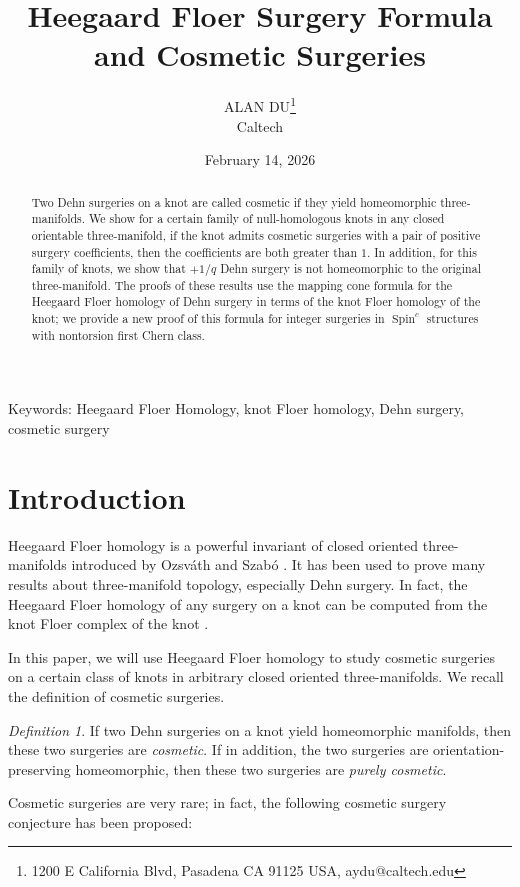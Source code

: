 \documentclass{article}
\title{Heegaard Floer Surgery Formula and Cosmetic Surgeries}
\author{ALAN DU\thanks{1200 E California Blvd, Pasadena CA 91125 USA, aydu@caltech.edu} \\
Caltech}
\date{February 14, 2026}
\theoremstyle{remark}
\newtheorem{definition}[equation]{Definition}
\numberwithin{equation}{section}
\numberwithin{table}{section}
\DeclareMathOperator{\Spin}{Spin}
\renewcommand{\(}{\left(}
\renewcommand{\)}{\right)}
\begin{document}
\maketitle
\begin{abstract}
Two Dehn surgeries on a knot are called cosmetic if they yield homeomorphic three-manifolds. We show for a certain family of null-homologous knots in any closed orientable three-manifold, if the knot admits cosmetic surgeries with a pair of positive surgery coefficients, then the coefficients are both greater than $1$. In addition, for this family of knots, we show that $+1/q$ Dehn surgery is not homeomorphic to the original three-manifold. The proofs of these results use the mapping cone formula for the Heegaard Floer homology of Dehn surgery in terms of the knot Floer homology of the knot; we provide a new proof of this formula for integer surgeries in $\Spin^c$ structures with nontorsion first Chern class.
\end{abstract}


Keywords: Heegaard Floer Homology, knot Floer homology, Dehn surgery, cosmetic surgery

\section{Introduction}

Heegaard Floer homology is a powerful invariant of closed oriented three-manifolds introduced by Ozsv\'ath and Szab\'o \cite{oz-sz-hf}. It has been used to prove many results about three-manifold topology, especially Dehn surgery. In fact, the Heegaard Floer homology of any surgery on a knot can be computed from the knot Floer complex of the knot \cite{oz-sz-integer,oz-sz-rational,zemke-hf-surgery-formula}. 

In this paper, we will use Heegaard Floer homology to study cosmetic surgeries on a certain class of knots in arbitrary closed oriented three-manifolds. We recall the definition of cosmetic surgeries.

\begin{definition}
If two Dehn surgeries on a knot yield homeomorphic manifolds, then these two surgeries are \textit{cosmetic}. If in addition, the two surgeries are orientation-preserving homeomorphic, then these two surgeries are \textit{purely cosmetic}.
\end{definition}

Cosmetic surgeries are very rare; in fact, the following cosmetic surgery conjecture has been proposed:
\end{document}
